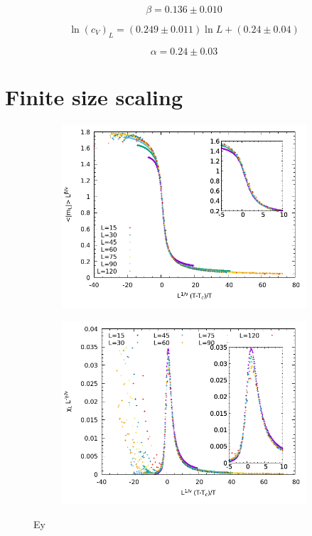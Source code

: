 \documentclass[a4paper]{article}
\begin{document}
\begin{equation*}
	\beta = 0.136 \pm 0.010
\end{equation*}

\begin{equation*}
	\ln ({c_V})_L = (0.249 \pm 0.011) \ln L + (0.24 \pm 0.04)
\end{equation*}

\begin{equation*}
	\alpha = 0.24 \pm 0.03
\end{equation*}

\section{Finite size scaling}

\begin{figure}[H]
    \centering
    \begin{subfigure}{.45\textwidth}
        \centering
        \includegraphics[width=\textwidth]{fss-m.png}
        \caption{}
        \label{fig:fss-m}
    \end{subfigure}
    \begin{subfigure}{.45\textwidth}
        \centering
        \includegraphics[width=\textwidth]{fss-x.png}
        \caption{}
        \label{fig:fss-x}
    \end{subfigure}
    \caption{Ey}
\label{fig:fss}
\end{figure}
\end{document}
